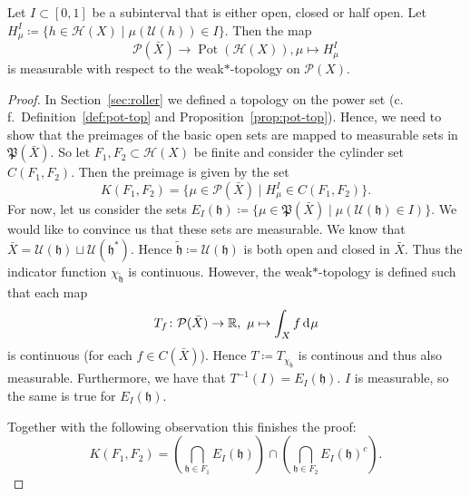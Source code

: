 \begin{lemma}[{\cites[Lem.\ A.1]{MR3509968}}]
  Let \(I \subset [0,1]\) be a subinterval that is either open, closed or half open. Let \(H^I_\mu \coloneqq \{h \in \mathcal{H}(X) \mid \mu(\mathcal{U}(h)) \in I\}\). Then the map
  \[
    \mathcal{P}(\bar X) \to \operatorname{Pot}(\mathcal{H}(X)), \mu \mapsto H^I_\mu
  \]
  is measurable with respect to the weak\(\ast\)-topology on \(\mathcal{P}(X)\).
\end{lemma}

\begin{proof}
  In Section~\ref{sec:roller} we defined a topology on the power set (c.\,f.\ Definition~\ref{def:pot-top} and Proposition~\ref{prop:pot-top}). Hence, we need to show that the preimages of the basic open sets are mapped to measurable sets in \(\mathfrak{P}(\bar X)\). So let \(F_1, F_2 \subset \mathcal{H}(X)\) be finite and consider the cylinder set \(C(F_1, F_2)\). Then the preimage is given by the set
  \[
    K(F_1, F_2) = \{\mu \in \mathcal{P}(\bar X) \mid H^I_\mu \in C(F_1, F_2)\}.
  \]
  For now, let us consider the sets \(E_I(\mathfrak{h}) \coloneqq \{\mu \in \mathfrak{P}(\bar X) \mid \mu(\mathcal{U}(\mathfrak{h}) \in I)\}\). We would like to convince us that these sets are measurable. We know that \(\bar X = \mathcal{U}(\mathfrak{h}) \sqcup \mathcal{U}(\mathfrak{h}^\ast)\). Hence \(\mathfrak{\tilde h} \coloneqq \mathcal{U}(\mathfrak{h})\) is both open and closed in \(\bar X\). Thus the indicator function \(\chi_{\mathfrak{\tilde h}}\) is continuous. However, the weak\(\ast\)-topology is defined such that each map
  \[
    T_f\colon \mathcal{P}(\bar X) \to \R,\ \mu \mapsto \int_X f \d\mu
  \]
  is continuous (for each \(f \in C(\bar X)\)). Hence \(T \coloneqq T_{\chi_{\mathfrak{\tilde h}}}\) is continous and thus also measurable. Furthermore, we have that \(T^{-1}(I) = E_I(\mathfrak{h})\). \(I\) is measurable, so the same is true for \(E_I(\mathfrak{h})\).

  Together with the following observation this finishes the proof:
  \[
    K(F_1, F_2) = \left (\bigcap_{\mathfrak{h} \in F_1} E_I(\mathfrak{h}) \right ) \cap \left ( \bigcap_{\mathfrak{h} \in F_2} E_I(\mathfrak{h})^{c}\right).
  \]
\end{proof}

